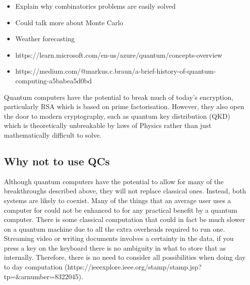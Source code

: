\begin{itemize}

\item Explain why combinatorics problems are easily solved
\item Could talk more about Monte Carlo
\item Weather forecasting
\item https://learn.microsoft.com/en-us/azure/quantum/concepts-overview
\item https://medium.com/@markus.c.braun/a-brief-history-of-quantum-computing-a5babea5d0bd
\end{itemize}
Quantum computers have the potential to break much of today's encryption, particularly RSA which is based on prime factorisation. However, they also open the door to modern cryptography, such as quantum key distribution (QKD) which is theoretically unbreakable by laws of Physics rather than just mathematically difficult to solve.

\subsection{Why not to use QCs}
Although quantum computers have the potential to allow for many of the breakthroughs described above, they will not replace classical ones. Instead, both systems are likely to coexist. Many of the things that an average user uses a computer for could not be enhanced to for any practical benefit by a quantum computer. There is some classical computation that could in fact be much slower on a quantum machine due to all the extra overheads required to run one. Streaming video or writing documents involves a certainty in the data, if you press a key on the keyboard there is no ambiguity in what to store that as internally. Therefore, there is no need to consider all possibilities when doing day to day computation (https://ieeexplore.ieee.org/stamp/stamp.jsp?tp=&arnumber=8322045).

